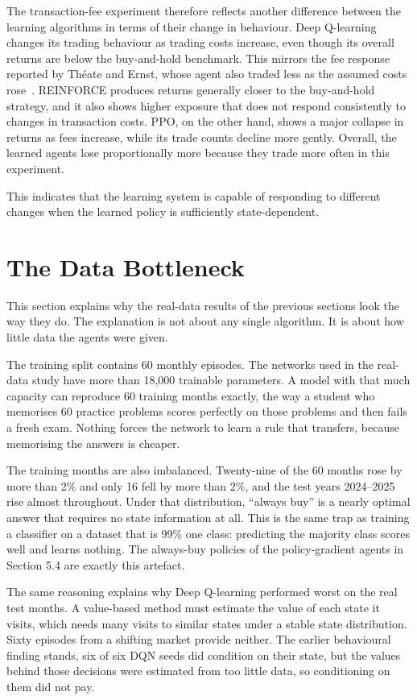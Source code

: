 The transaction-fee experiment therefore reflects another difference
between the learning algorithms in terms of their change in behaviour.
Deep Q-learning changes its trading behaviour as trading costs increase,
even though its overall returns are below the buy-and-hold benchmark. This mirrors the fee response reported by Th\'eate and Ernst, whose agent also traded less as the assumed costs rose~\cite{theate2021}.
REINFORCE produces returns generally closer to the buy-and-hold
strategy, and it also shows higher exposure that does not respond
consistently to changes in transaction costs. PPO, on the other hand,
shows a major collapse in returns as fees increase, while its trade
counts decline more gently. Overall, the learned agents lose
proportionally more because they trade more often in this experiment.

This indicates that the learning system is capable of responding to
different changes when the learned policy is sufficiently
state-dependent.

\section{The Data Bottleneck}

This section explains why the real-data results of the previous sections
look the way they do. The explanation is not about any single algorithm.
It is about how little data the agents were given.

The training split contains 60 monthly episodes. The networks used in
the real-data study have more than 18,000 trainable parameters. A model
with that much capacity can reproduce 60 training months exactly, the
way a student who memorises 60 practice problems scores perfectly on
those problems and then fails a fresh exam. Nothing forces the network
to learn a rule that transfers, because memorising the answers is
cheaper.

The training months are also imbalanced. Twenty-nine of the 60 months
rose by more than 2\% and only 16 fell by more than 2\%, and the test
years 2024--2025 rise almost throughout. Under that distribution,
``always buy'' is a nearly optimal answer that requires no state
information at all. This is the same trap as training a classifier on a
dataset that is 99\% one class: predicting the majority class scores
well and learns nothing. The always-buy policies of the policy-gradient
agents in Section 5.4 are exactly this artefact.

The same reasoning explains why Deep Q-learning performed worst on the
real test months. A value-based method must estimate the value of each
state it visits, which needs many visits to similar states under a
stable state distribution. Sixty episodes from a shifting market provide
neither. The earlier behavioural finding stands, six of six DQN seeds
did condition on their state, but the values behind those decisions were
estimated from too little data, so conditioning on them did not pay.

